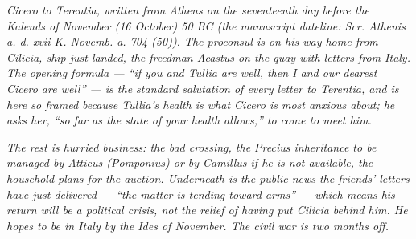 
\textit{Cicero to Terentia, written from Athens on the seventeenth
day before the Kalends of November (16 October) 50 BC (the manuscript
dateline: \textit{Scr. Athenis a. d. xvii K. Novemb. a. 704 (50)}).
The proconsul is on his way home from Cilicia, ship just landed, the
freedman Acastus on the quay with letters from Italy. The opening
formula --- ``if you and Tullia are well, then I and our dearest
Cicero are well'' --- is the standard salutation of every letter to
Terentia, and is here so framed because Tullia's health is what
Cicero is most anxious about; he asks her, ``so far as the state of
your health allows,'' to come to meet him.}

\textit{The rest is hurried business: the bad crossing, the Precius
inheritance to be managed by Atticus (Pomponius) or by Camillus if
he is not available, the household plans for the auction. Underneath
is the public news the friends' letters have just delivered ---
``the matter is tending toward arms'' --- which means his return will
be a political crisis, not the relief of having put Cilicia behind
him. He hopes to be in Italy by the Ides of November. The civil war
is two months off.}
